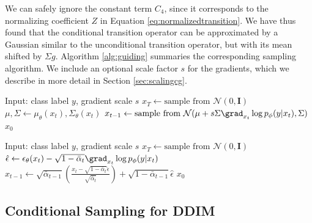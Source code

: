 We can safely ignore the constant term $C_4$, since it corresponds to the normalizing coefficient $Z$ in Equation \ref{eq:normalizedtransition}. We have thus found that the conditional transition operator can be approximated by a Gaussian similar to the unconditional transition operator, but with its mean shifted by $\Sigma g$. Algorithm \ref{alg:guiding} summaries the corresponding sampling algorithm. We include an optional scale factor $s$ for the gradients, which we describe in more detail in Section \ref{sec:scalingcg}.

\begin{algorithm}[t]
    \caption{Classifier guided diffusion sampling, given a diffusion model $(\mu_{\theta}(x_t), \Sigma_{\theta}(x_t))$, classifier $p_{\phi}(y|x_t)$, and gradient scale $s$.}
    \label{alg:guiding}
    \begin{algorithmic}
        \STATE Input: class label $y$, gradient scale $s$
        \STATE $x_T \gets \text{sample from } \mathcal{N}(0, \mathbf{I})$
            \STATE $\mu, \Sigma \gets \mu_{\theta}(x_t), \Sigma_{\theta}(x_t)$
            \STATE $x_{t-1} \gets \text{sample from } \mathcal{N}(\mu + s \Sigma \grad_{x_t} \log p_{\phi}(y|x_t), \Sigma)$
        \ENDFOR
        \RETURN $x_0$
    \end{algorithmic}
\end{algorithm}

\begin{algorithm}[t]
    \caption{Classifier guided DDIM sampling, given a diffusion model $\epsilon_{\theta}(x_t)$, classifier $p_{\phi}(y|x_t)$, and gradient scale $s$.}
    \label{alg:guidingddim}
    \begin{algorithmic}
        \STATE Input: class label $y$, gradient scale $s$
        \STATE $x_T \gets \text{sample from } \mathcal{N}(0, \mathbf{I})$
            \STATE $\hat \epsilon \gets \epsilon_{\theta}(x_t) - \sqrt{1-\bar{\alpha}_t} \grad_{x_t} \log p_{\phi}(y|x_t)$
            \STATE $x_{t-1} \gets \sqrt{\bar{\alpha}_{t-1}} \left( \frac{x_t - \sqrt{1-\bar{\alpha}_t} \hat{\epsilon}}{\sqrt{\bar{\alpha}_t}} \right) + \sqrt{1-\bar{\alpha}_{t-1}} \hat{\epsilon}$
        \ENDFOR
        \RETURN $x_0$
    \end{algorithmic}
\end{algorithm}

\subsection{Conditional Sampling for DDIM}
\label{sec:ddimguide}


